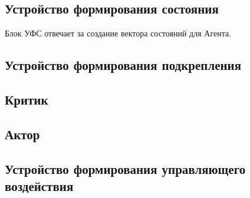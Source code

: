 \subsection{Устройство формирования состояния} \label{subsect2_2_2}
Блок УФС отвечает за создание вектора состояний для Агента. 

\subsection{Устройство формирования подкрепления} \label{subsect2_2_3}

\subsection{Критик} \label{subsect2_2_4}

\subsection{Актор} \label{subsect2_2_5}

\subsection{Устройство формирования управляющего воздействия} \label{subsect2_2_6}

